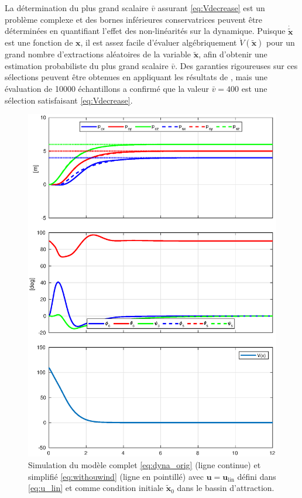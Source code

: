 La détermination du plus grand scalaire $\bar v$ assurant \eqref{eq:Vdecrease} est un problème complexe et des bornes inférieures conservatrices peuvent être déterminées en quantifiant l'effet des non-linéarités sur la dynamique. Puisque $\boldsymbol{\dot{\tilde x}}$ est une fonction de $\boldsymbol{x}$, il est assez facile d'évaluer algébriquement $\dot V(\boldsymbol{\tilde x})$ pour un grand nombre d'extractions aléatoires de la variable $\boldsymbol{\tilde x}$, afin d'obtenir une estimation probabiliste du plus grand scalaire $\bar v$. Des garanties rigoureuses sur ces sélections peuvent être obtenues en appliquant les résultats de \cite{tempo2013randomized}, mais une évaluation de 10000 échantillons a confirmé que la valeur $\bar v = 400$ est une sélection satisfaisant \eqref{eq:Vdecrease}.


\begin{figure}[ht!]
    \centering
    \includegraphics[trim=0cm 0.6cm 0cm 1cm,clip,width=0.8\columnwidth]{figures/converge2.eps}
    \caption{Simulation du modèle complet \eqref{eq:dyna_orig} (ligne continue) et simplifié \eqref{eq:withouwind} (ligne en pointillé) avec $\boldsymbol{u} = \boldsymbol{u}_{\text{lin}}$ défini dans 
    \eqref{eq:u_lin} et comme condition initiale $\tilde{ \boldsymbol{x}}_0$ dans le bassin d'attraction.}
    \label{fig_linearize_conv}
\end{figure}

